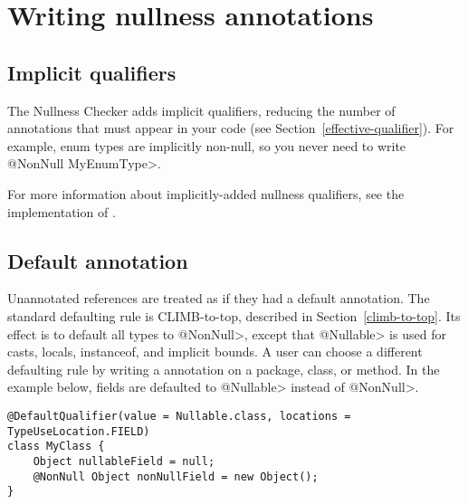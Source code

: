 \section{Writing nullness annotations\label{writing-nullness-annotations}}

\subsection{Implicit qualifiers\label{nullness-implicit-qualifiers}}

The Nullness Checker
adds implicit qualifiers, reducing the number of annotations that must
appear in your code (see Section~\ref{effective-qualifier}).
For example, enum types are implicitly non-null, so you never need to write
\<@NonNull MyEnumType>.

For more information about implicitly-added nullness qualifiers, see the
implementation of .



\subsection{Default annotation\label{null-defaults}}

Unannotated references are treated as if they had a default annotation.
The standard defaulting rule is CLIMB-to-top,  described in
Section~\ref{climb-to-top}.  Its effect is to default all types to
\<@NonNull>, except that \<@Nullable> is used for casts, locals,
instanceof, and implicit bounds.  A user can choose a different defaulting
rule by writing a  annotation on a
 package, class, or method.  In the example below, fields are defaulted to
\<@Nullable> instead of \<@NonNull>.

\begin{Verbatim}
@DefaultQualifier(value = Nullable.class, locations = TypeUseLocation.FIELD)
class MyClass {
    Object nullableField = null;
    @NonNull Object nonNullField = new Object();
}
\end{Verbatim}


